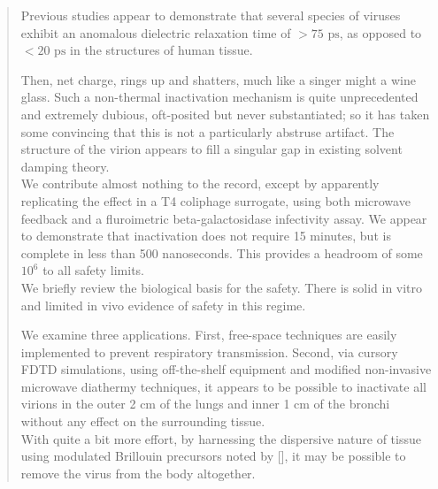 \documentclass[paper.tex]{subfiles}
\begin{document}
\begin{quotation} %

Previous studies appear to demonstrate that several species of viruses exhibit an anomalous dielectric relaxation time of $> 75 \text{ ps}$, as opposed to $< 20 \text{ ps}$ \footnotemark \dubiousdiscuss in the structures of human tissue.


Then, net charge, rings up and shatters, much like a singer might a wine glass. Such a non-thermal inactivation mechanism is quite unprecedented and extremely dubious, oft-posited but never substantiated; so it has taken some convincing that this is not a particularly abstruse artifact. The structure of the virion appears to fill a singular gap in existing solvent damping theory.\\


We contribute almost nothing to the record, except by apparently replicating the effect in a T4 coliphage surrogate, using both microwave feedback and a fluroimetric beta-galactosidase infectivity assay. We appear to demonstrate that inactivation does not require 15 minutes, but is complete in less than 500 nanoseconds. This provides a headroom of some $10^6$ to all safety limits. \\

We briefly review the biological basis for the safety. There is solid in vitro and limited in vivo evidence of safety in this regime.


We examine three applications. First, free-space techniques are easily implemented to prevent respiratory transmission.
%
Second, via cursory FDTD simulations, using off-the-shelf equipment and modified non-invasive microwave diathermy techniques, it appears to be possible to inactivate all virions in the outer 2 cm of the lungs and inner 1 cm of the bronchi without any effect on the surrounding tissue. 
\\

With quite a bit more effort, by harnessing the dispersive nature of tissue using modulated Brillouin precursors noted by [], it may be possible to remove the virus from the body altogether.\\


\end{quotation}
\end{document}
